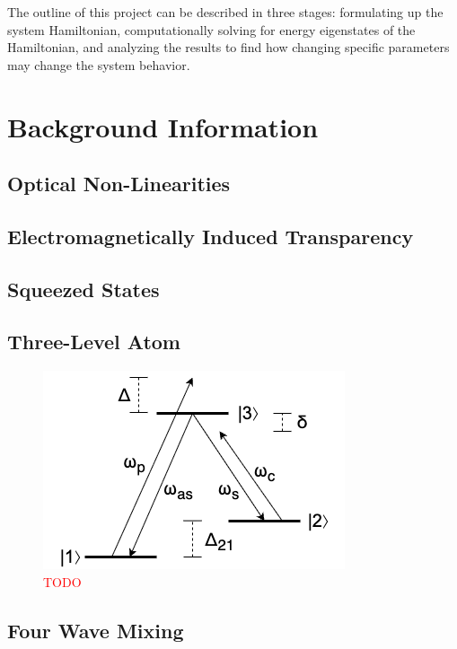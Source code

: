 \documentclass[aps,pra,twocolumn,showpacs,amsmath,amssymb,nofootinbib,longbibliography,superscriptaddress
]{revtex4-1}
\theoremstyle{definition}
\theoremstyle{remark}
\newcommand{\0}{\hat{0}}
\begin{document}
The outline of this project can be described in three stages: formulating up the system Hamiltonian, computationally solving for energy eigenstates of the Hamiltonian, and analyzing the results to find how changing specific parameters may change the system behavior.


\section{Background Information}

\subsection{Optical Non-Linearities}

\subsection{Electromagnetically Induced Transparency}

\subsection{Squeezed States}

\subsection{Three-Level Atom}

\begin{figure}
    \includegraphics[width=\columnwidth]{ThreeLevelAtom.png}
    \caption{\textcolor{red}{TODO}}
    \label{ThreeLevelAtom}
\end{figure}

\subsection{Four Wave Mixing}
\end{document}
